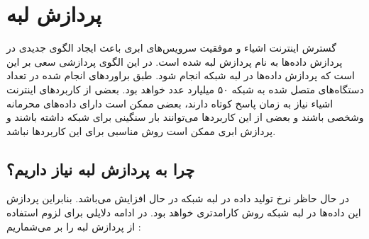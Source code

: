   \section{پردازش لبه}
    گسترش اینترنت اشیاء و موفقیت سرویس‌های ابری باعث ایجاد الگو‌ی جدیدی در پردازش داده‌ها به نام پردازش لبه  شده است.
    در این الگوی پردازشی سعی بر این است که پردازش داده‌ها در لبه شبکه انجام شود.
    طبق براورد‌های انجام شده در \cite{2018cisco} تعداد دستگاه‌های متصل شده به شبکه ۵۰ میلیارد عدد خواهد بود.
    بعضی از کاربردهای اینترنت اشیاء نیاز به زمان پاسخ کوتاه دارند، بعضی ممکن است دارای داده‌های محرمانه وشخصی باشند و بعضی از این کاربرد‌ها می‌توانند بار سنگینی برای شبکه داشته باشند و پردازش ابری ممکن است روش مناسبی برای این کاربرد‌ها نباشد.

    \subsection{چرا به پردازش لبه نیاز داریم؟}
      در حال حاظر نرخ تولید داده در لبه شبکه در حال افزایش می‌باشد.
      بنابراین پردازش این داده‌ها در لبه شبکه روش کارامدتری خواهد بود.
      در ادامه دلایلی برای لزوم استفاده از پردازش لبه را بر می‌شماریم \cite{shi2016edge}:
